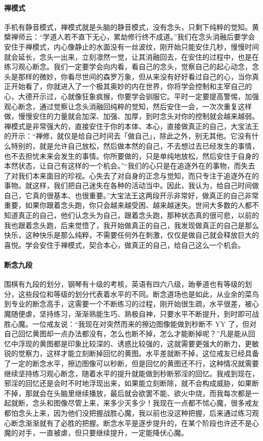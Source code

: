 \paragraph{禅模式}

手机有静音模式，禅模式就是头脑的静音模式，没有念头，只剩下纯粹的觉知。黄檗禅师云：“学道人若不直下无心，累劫修行终不成道。”我们在念头消融后要学会安住于禅模式，内心像静止的水面没有一丝波纹，刚开始只能安住几秒，慢慢时间就会延长，念头一出来，立刻凛然一觉，让其消融回去，在安住的过程中，也是在练习观心断念。我们一定要学会向内看，看自己的念头，觉察自己的起心动念，念头是那样的微妙，你看尽世间的森罗万象，但从来没有好好看过自己的心，当你真正开始看了，你就进入了一个极其奥妙的内在世界，你将学会控制和主宰自己的心，大德开示过，心就像狂象疯猴，你要学会驯服它。平时一定要提高警惕，加强观心断念，通过觉察让念头消融回纯粹的觉知，然后安住一会，一次次重复这样做，慢慢安住的力量就会加深、加强、加厚，到时念头对你的控制就会越来越弱。禅模式是非常强大的，直接安住于你的本体、本心，直接做真正的自己，大宝法王的开示：“禅修，就仅是给自己时间去「做自己」，除此之外，别无其他。它没有什么特别的，就是允许自己放松，然后做本然的自己，不去想过去已经发生的事情，也不去担忧未来会发生的事情。你所要做的，只是单纯地放松，然后安住于自身的本然状态，让自己有这样的一个机会。”“我们的心只是在追逐外在的事物，而失去了对我们本来面目的珍视。心失去了对自身的正念与觉知，而只专注于追逐外在的事物。就这样，我们把自己迷失在各种的活动当中。因此，我认为，给自己时间做自己，它真的很基本、也很重要。”大宝法王这两段开示非常好，做真正的自己非常重要，如果你跟着念头跑，你只会越来越受困、越来越迷失。世间大多数的人都不知道真正的自己，他们认念头为自己，跟着念头跑，那种状态真的很可悲，以前的我也跟着念头跑，后来觉悟了，我开始做真正的自己，我发现做真正的自己是那么快乐，这种快乐是那么纯粹，不需要任何外在刺激，仅仅是做自己就会释放巨大的喜悦。学会安住于禅模式，契合本心，做真正的自己，给自己这么一个机会。

\paragraph{断念九段}

围棋有九段的划分，钢琴有十级的考核，英语有四六八级，跆拳道也有等级的划分，这些段位和等级的划分代表着水平的不同。断念道场也是如此，从业余的菜鸟到专业的断念高手，这需要一个不断练习的过程，刚开始很生疏，水平很差，被心魔随便虐，坚持练习，渐渐熟能生巧、熟极自神，只要水平不断提升，到时即可战胜心魔。一位戒友说：“我现在对突然而来的擦边图像能做到秒断不 YY 了，但对自己回忆黄图却一点办法都没有，怎么也断不掉，怎么才能断掉呢？”凡是能从回忆中浮现的黄图都是印象比较深的、诱惑比较强的，这就需要更强大的断力，更敏锐的觉察力，这样才能立刻断掉回忆的黄图。水平差就断不掉，这位戒友已经具备了一定的断念水平，擦边图像可以秒断，但是回忆的黄图还不行，这种情况就需要继续坚持练习观心断念，随着水平的提升就能做到秒断邪淫的回忆。我戒到现在，邪淫的回忆还是会时不时地浮现出来，如果能立刻断除，就不会构成威胁，如果断不掉，那就会在头脑里继续播放，最后就会欲罢不能、欲火中烧，而我每次都是一起就断，念头和图像尽管上来，来多少灭多少！我现在一点都不怵心魔，很多戒友都怕念头上来，因为他们没把握战胜心魔，我以前也没这种把握，后来通过练习观心断念渐渐就有了必胜的把握。断念水平是逐步提升的，在某个阶段也许还不是心魔的对手，一直被虐，但只要继续提升，一定能降伏心魔。

